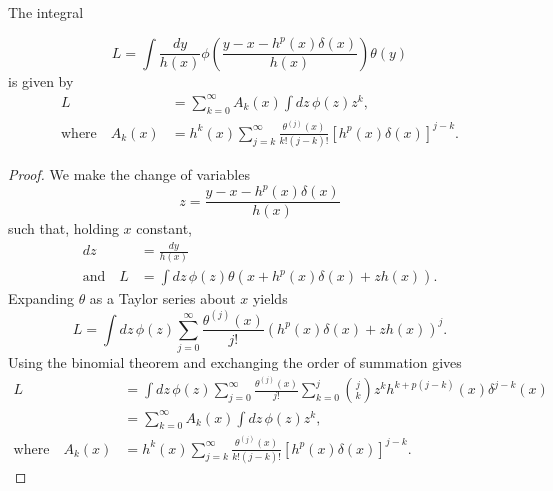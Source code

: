 \label{app:proofs}
\begin{lem}
\label{lem:integral-balloon}The integral

\[
L=\int\frac{dy}{h\left(x\right)}\phi\left(\frac{y-x-h^{p}\left(x\right)\delta\left(x\right)}{h\left(x\right)}\right)\theta\left(y\right)
\]
is given by
\begin{align*}
L & =\sum_{k=0}^{\infty}A_{k}\left(x\right)\int dz\,\phi\left(z\right)z^{k},\\
\text{where}\quad A_{k}\left(x\right) & =h^{k}\left(x\right)\sum_{j=k}^{\infty}\frac{\theta^{\left(j\right)}\left(x\right)}{k!\left(j-k\right)!}\left[h^{p}\left(x\right)\delta\left(x\right)\right]^{j-k}.
\end{align*}
\end{lem}
\begin{proof}
We make the change of variables 
\[
z=\frac{y-x-h^{p}\left(x\right)\delta\left(x\right)}{h\left(x\right)}
\]
such that, holding $x$ constant,
\begin{align*}
dz & =\frac{dy}{h\left(x\right)}\\
\text{and}\quad L & =\int dz\,\phi\left(z\right)\theta\left(x+h^{p}\left(x\right)\delta\left(x\right)+zh\left(x\right)\right).
\end{align*}
Expanding $\theta$ as a Taylor series about $x$ yields
\[
L=\int dz\,\phi\left(z\right)\sum_{j=0}^{\infty}\frac{\theta^{\left(j\right)}\left(x\right)}{j!}\left(h^{p}\left(x\right)\delta\left(x\right)+zh\left(x\right)\right)^{j}.
\]
Using the binomial theorem and exchanging the order of summation gives
\begin{align*}
L & =\int dz\,\phi\left(z\right)\sum_{j=0}^{\infty}\frac{\theta^{\left(j\right)}\left(x\right)}{j!}\sum_{k=0}^{j}\binom{j}{k}z^{k}h^{k+p\left(j-k\right)}\left(x\right)\delta^{j-k}\left(x\right)\\
 & =\sum_{k=0}^{\infty}A_{k}\left(x\right)\int dz\,\phi\left(z\right)z^{k},\\
\text{where}\quad A_{k}\left(x\right) & =h^{k}\left(x\right)\sum_{j=k}^{\infty}\frac{\theta^{\left(j\right)}\left(x\right)}{k!\left(j-k\right)!}\left[h^{p}\left(x\right)\delta\left(x\right)\right]^{j-k}.
\end{align*}

\end{proof}

